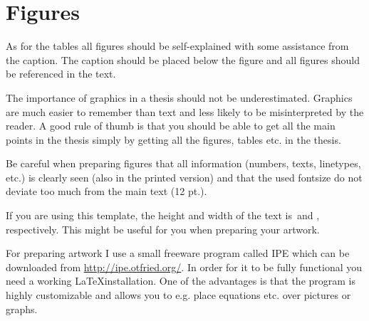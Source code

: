 \section{Figures}
As for the tables all figures should be self-explained with some assistance from the caption. The caption should be placed below the figure and all figures should be referenced in the text. 

The importance of graphics in a thesis should not be underestimated. Graphics are much easier to remember than text and less likely to be misinterpreted by the reader. A good rule of thumb is that you should be able to get all the main points in the thesis simply by getting all the figures, tables etc. in the thesis.

Be careful when preparing figures that all information (numbers, texts, linetypes, etc.) is clearly seen (also in the printed version) and that the used fontsize do not deviate too much from the main text (12 pt.). 

If you are using this template, the height and width of the text is \the\textheight \,and \the\textwidth, respectively. This might be useful for you when preparing your artwork.

For preparing artwork I use a small freeware program called IPE which can be downloaded from \url{http://ipe.otfried.org/}. In order for it to be fully functional you need a working \LaTeX installation. One of the advantages is that the program is highly customizable and allows you to e.g. place equations etc. over pictures or graphs.

